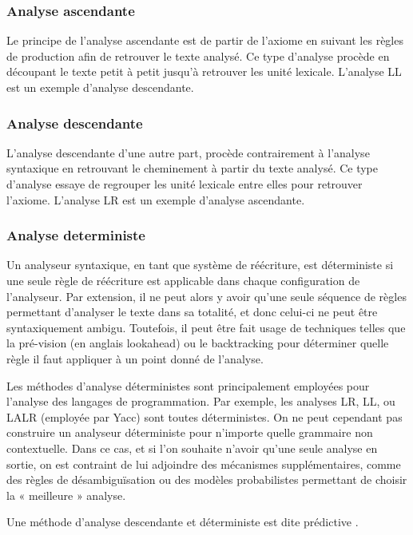 \documentclass{article}
\begin{document}
\subsubsection{Analyse ascendante}
Le principe de l’analyse ascendante  est de partir de l’axiome en suivant les règles de production afin de retrouver le texte analysé. Ce type d’analyse procède en découpant le texte petit à petit jusqu'à retrouver les unité lexicale. L’analyse LL est un exemple d’analyse descendante.

\subsubsection{Analyse descendante}
L’analyse descendante d’une autre part, procède contrairement à l’analyse syntaxique en retrouvant le cheminement à partir du texte analysé. Ce type d’analyse essaye de regrouper les unité lexicale entre elles pour retrouver l’axiome. L’analyse LR est un exemple d’analyse ascendante.

\subsubsection{Analyse deterministe}

Un analyseur syntaxique, en tant que système de réécriture, est déterministe si une seule règle de réécriture est applicable dans chaque configuration de l'analyseur. Par extension, il ne peut alors y avoir qu'une seule séquence de règles permettant d'analyser le texte dans sa totalité, et donc celui-ci ne peut être syntaxiquement ambigu. Toutefois, il peut être fait usage de techniques telles que la pré-vision (en anglais lookahead) ou le backtracking pour déterminer quelle règle il faut appliquer à un point donné de l'analyse.

Les méthodes d'analyse déterministes sont principalement employées pour l'analyse des langages de programmation. Par exemple, les analyses LR, LL, ou LALR (employée par Yacc) sont toutes déterministes. On ne peut cependant pas construire un analyseur déterministe pour n'importe quelle grammaire non contextuelle. Dans ce cas, et si l'on souhaite n'avoir qu'une seule analyse en sortie, on est contraint de lui adjoindre des mécanismes supplémentaires, comme des règles de désambiguïsation ou des modèles probabilistes permettant de choisir la « meilleure » analyse.

Une méthode d’analyse descendante et déterministe est dite prédictive \cite{refAnalyseSyntaxique}.
\end{document}
